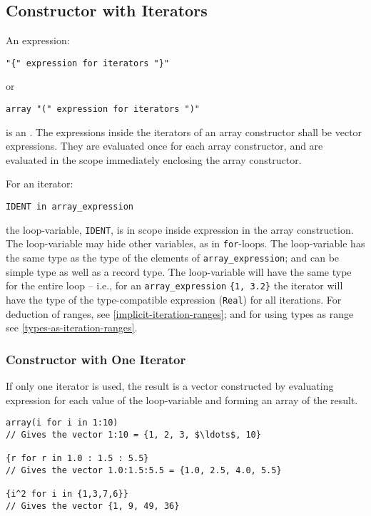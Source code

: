 \subsection{Constructor with Iterators}\label{array-constructor-with-iterators}\label{constructor-with-iterators}

An expression:
\begin{lstlisting}[language=grammar]
"{" expression for iterators "}"
\end{lstlisting}
or
\begin{lstlisting}[language=grammar]
array "(" expression for iterators ")"
\end{lstlisting}
is an .
The expressions inside the iterators of an array constructor shall be vector expressions.
They are evaluated once for each array constructor, and are evaluated in the scope immediately enclosing the array constructor.

For an iterator:
\begin{lstlisting}[language=modelica]
IDENT in array_expression
\end{lstlisting}
the loop-variable, \lstinline!IDENT!, is in scope inside expression in the array construction.
The loop-variable may hide other variables, as in \lstinline!for!-loops.
The loop-variable has the same type as
the type of the elements of \lstinline!array_expression!; and can be simple type as well as a record type.
The loop-variable will have the same type for the entire loop -- i.e., for an
\lstinline!array_expression! \lstinline!{1, 3.2}! the iterator will have the type of the type-compatible expression (\lstinline!Real!) for all iterations.
For deduction of ranges, see
\cref{implicit-iteration-ranges}; and for using types as range see \cref{types-as-iteration-ranges}.

\subsubsection{Constructor with One Iterator}\label{array-constructor-with-one-iterator}\label{constructor-with-one-iterator}

If only one iterator is used, the result is a vector constructed by
evaluating expression for each value of the loop-variable and forming an
array of the result.

\begin{example}
\begin{lstlisting}[language=modelica]
array(i for i in 1:10)
// Gives the vector 1:10 = {1, 2, 3, $\ldots$, 10}

{r for r in 1.0 : 1.5 : 5.5}
// Gives the vector 1.0:1.5:5.5 = {1.0, 2.5, 4.0, 5.5}

{i^2 for i in {1,3,7,6}}
// Gives the vector {1, 9, 49, 36}
\end{lstlisting}
\end{example}

